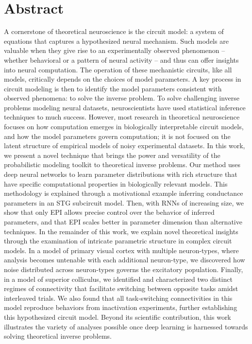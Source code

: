 \documentclass[11pt]{article}
\begin{document}
\section{Abstract}
A cornerstone of theoretical neuroscience is the circuit model: a system of equations that captures a hypothesized neural mechanism.  
Such models are valuable when they give rise to an experimentally observed phenomenon -- whether behavioral or a pattern of neural activity -- and thus can offer insights into neural computation.
The operation of these mechanistic circuits, like all models, critically depends on the choices of model parameters.
A key process in circuit modeling is then to identify the model parameters consistent with observed phenomena: to solve the inverse problem.
To solve challenging inverse problems modeling neural datasets, neuroscientists have used statistical inference techniques to much success. 
However, most research in theoretical neuroscience focuses on how computation emerges in biologically interpretable circuit models, and how the model parameters govern computation; it is not focused on the latent structure of empirical models of noisy experimental datasets.
In this work, we present a novel technique that brings the power and versatility of the probabilistic modeling toolkit to theoretical inverse problems.
Our method uses deep neural networks to learn parameter distributions with rich structure that have specific computational properties in biologically relevant models.
This methodology is explained through a motivational example inferring conductance parameters in an STG subcircuit model.
Then, with RNNs of increasing size, we show that only EPI allows precise control over the behavior of inferred parameters, and that EPI scales better in parameter dimension than alternative techniques.
In the remainder of this work, we explain novel theoretical insights through the examination of intricate parametric structure in complex circuit models.
In a model of primary visual cortex with multiple neuron-types, where analysis becomes untenable with each additional neuron-type, we discovered how noise distributed across neuron-types governs the excitatory population.
Finally, in a model of superior colliculus, we identified and characterized two distinct regimes of connectivity that facilitate switching between opposite tasks amidst interleaved trials. 
We also found that all task-switching connectivities in this model reproduce behaviors from inactivation experiments, further establishing this hypothesized circuit model.
Beyond its scientific contribution, this work illustrates the variety of analyses possible once deep learning is harnessed towards solving theoretical inverse problems.
\end{document}
